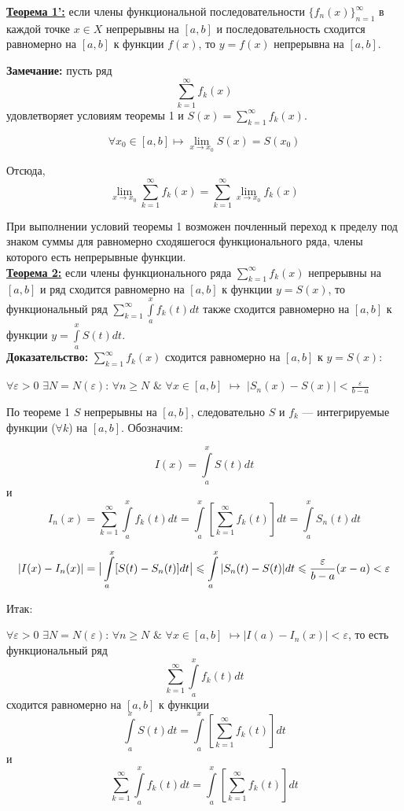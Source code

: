 \documentclass[a4paper,12pt]{article} %
\renewcommand {\geq}{\geqslant}
\renewcommand {\leq}{\leqslant}
\begin{document}
\underline{\textbf{Теорема 1':}} если члены функциональной последовательности $\{f_n(x)\}_{n=1}^\infty$ в каждой точке $x \in X$  непрерывны на $[a,b]$ и последовательность сходится равномерно на $[a,b]$ к функции $f(x)$, то $y = f(x)$ непрерывна на $[a,b]$. 

\textbf{Замечание:} пусть ряд $$\sum\limits_{k = 1}^{\infty}  f_k(x)$$ удовлетворяет условиям теоремы 1 и $S(x)=\sum\limits_{k = 1}^{\infty}  f_k(x)$.

$$\forall x_0 \in [a,b] \longmapsto \lim\limits_{x\rightarrow x_0} S(x) = S(x_0)$$

Отсюда, $$\lim\limits_{x\rightarrow x_0} \sum\limits_{k = 1}^{\infty}  f_k(x) = \sum\limits_{k = 1}^{\infty}  \lim\limits_{x\rightarrow x_0}f_k(x) $$

При выполнении условий теоремы 1 возможен почленный переход к пределу под знаком суммы для  равномерно сходяшегося функционального ряда, члены которого есть непрерывные функции.\\

\underline{\textbf{Теорема 2:}} если члены функционального ряда $\sum\limits_{k = 1}^{\infty}  f_k(x)$   непрерывны на $[a,b]$ и ряд сходится равномерно на $[a,b]$ к функции $y = S(x)$, то функциональный ряд $\sum\limits_{k = 1}^{\infty}  \int\limits_{a}^{x}f_k(t)dt$ также сходится равномерно на $[a,b]$ к функции $y = \int\limits_{a}^{x}S(t)dt $.\\

\textbf{Доказательство:}
$\sum\limits_{k = 1}^{\infty}  f_k(x)$  сходится равномерно на $[a,b]$ к $y = S(x)$:

$\forall \varepsilon > 0$  $\exists N = N(\varepsilon)$: $\forall n \geqslant N$ $\& $ $\forall x \in [a,b]$ $\longmapsto$ $|S_n(x)-S(x)| < \frac{\varepsilon}{b - a}$

По теореме 1 $S$ непрерывны на $[a,b]$, следовательно $S$ и $f_k $ --- интегрируемые функции ($\forall k$) на $[a,b]$. Обозначим:

$$I(x) = \int\limits_{a}^{x}S(t)dt$$ и $$I_{n}(x) = \sum\limits_{k = 1}^{\infty}  \int\limits_{a}^{x}f_k(t)dt = \int\limits_{a}^{x}[ \sum\limits_{k = 1}^{\infty}  f_k(t) ]dt = \int\limits_{a}^x S_n(t)dt$$

$$|I(x)-I_n(x)| = \big|\int\limits_{a}^x[S(t)-S_n(t)]dt\big| \leq \int\limits_{a}^x|S_n(t)-S(t)|dt \leq {\varepsilon \over {b-a}} (x-a) < \varepsilon$$

Итак: 

$\forall \varepsilon > 0 $ $\exists N=N(\varepsilon)$: $\forall n \geq N$  $\&$ $\forall x \in [a,b]$ $\longmapsto |I(a)-I_n(x)| < \varepsilon$, то есть функциональный ряд $$\sum\limits_{k = 1}^{\infty} \int\limits_{a}^{x}f_k(t)dt$$ сходится равномерно на $[a,b]$ к функции $$\int\limits_a^xS(t)dt = \int\limits_{a}^{x}[ \sum\limits_{k = 1}^{\infty}  f_k(t) ]dt$$ и $$\sum\limits_{k = 1}^{\infty}  \int\limits_{a}^{x}f_k(t)dt = \int\limits_{a}^{x}[ \sum\limits_{k = 1}^{\infty}  f_k(t) ]dt$$\\
\end{document}
